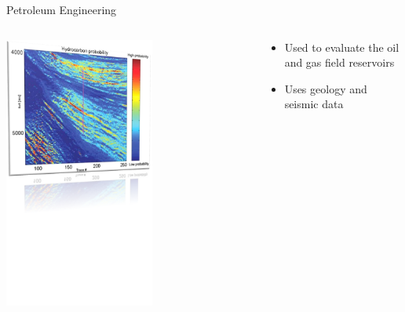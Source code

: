 \documentclass[
  ignorenonframetext,
]{beamer}
\providecommand{\tightlist}{%
  \setlength{\itemsep}{0pt}\setlength{\parskip}{0pt}}\usepackage{longtable,booktabs,array}
\begin{document}
\begin{frame}{Petroleum Engineering}
\label{petroleum-engineering}
\begin{columns}[T]
\begin{column}{0.6\textwidth}
\includegraphics[width=0.6\textwidth,height=\textheight]{../../presentations/20240222_UNC_ESE_Guest_Lecture/petroleum.png}
\end{column}

\begin{column}{0.4\textwidth}
\begin{itemize}
\tightlist
\item
  Used to evaluate the oil and gas field reservoirs
\item
  Uses geology and seismic data
\end{itemize}
\end{column}
\end{columns}
\end{frame}
\end{document}
